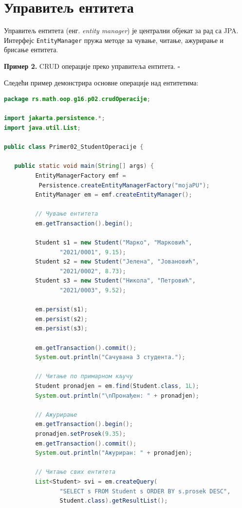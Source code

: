 \section{Управитељ ентитета}

Управитељ ентитета (енг. \textit{entity manager}) је централни објекат за рад са JPA. Интерфејс \texttt{EntityManager} пружа методе за чување, читање, ажурирање и брисање ентитета.


\bigskip

\noindent \textbf{Пример 2.} CRUD операције преко управитеља ентитета. $\square$

\medskip

Следећи пример демонстрира основне операције над ентитетима:


\begin{lstlisting}[language=Java]
package rs.math.oop.g16.p02.crudOperacije;
 
import jakarta.persistence.*;
import java.util.List;
 
public class Primer02_StudentOperacije {
 
   public static void main(String[] args) {
         EntityManagerFactory emf =
          Persistence.createEntityManagerFactory("mojaPU");
         EntityManager em = emf.createEntityManager();
 
         // Чување ентитета
         em.getTransaction().begin();
 
         Student s1 = new Student("Марко", "Марковић",
                "2021/0001", 9.15);
         Student s2 = new Student("Јелена", "Јовановић",
                "2021/0002", 8.73);
         Student s3 = new Student("Никола", "Петровић",
                "2021/0003", 9.52);
 
         em.persist(s1);
         em.persist(s2);
         em.persist(s3);
 
         em.getTransaction().commit();
         System.out.println("Сачувана 3 студента.");
 
         // Читање по примарном кључу
         Student pronadjen = em.find(Student.class, 1L);
         System.out.println("\nПронађен: " + pronadjen);
 
         // Ажурирање
         em.getTransaction().begin();
         pronadjen.setProsek(9.35);
         em.getTransaction().commit();
         System.out.println("Ажуриран: " + pronadjen);
 
         // Читање свих ентитета
         List<Student> svi = em.createQuery(
                "SELECT s FROM Student s ORDER BY s.prosek DESC",
                Student.class).getResultList();
 

\end{lstlisting}
